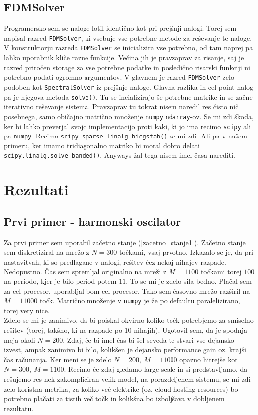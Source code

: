 \documentclass[a4paper]{article}
\begin{document}
\subsection{FDMSolver}
Programersko sem se naloge lotil identično kot pri prejšnji nalogi. Torej sem napisal razred \texttt{FDMSolver},
ki vsebuje vse potrebne metode za reševanje te naloge. V konstruktorju razreda \texttt{FDMSolver} se inicializira
vse potrebno, od tam naprej pa lahko uporabnik kliče razne funkcije. Večina jih je pravzaprav za risanje, saj je 
razred priročen storage za vse potrebne podatke in posledično risarski funkciji ni potrebno podati ogromno argumentov.
V glavnem je razred \texttt{FDMSolver} zelo podoben kot \texttt{SpectralSolver} iz prejšnje naloge. Glavna razlika
in cel point nalog pa je njegova metoda \texttt{solve()}. Tu se incializirajo še potrebne matrike in se začne iterativno
reševanje sistema. Pravzaprav tu tokrat nisem naredil res čisto nič posebnega, samo običajno matrično množenje
\texttt{numpy} \texttt{ndarray}-ov. Se mi zdi škoda, ker bi lahko preverjal svojo implementacijo proti kaki, ki jo 
ima recimo \texttt{scipy} ali pa \texttt{numpy}. Recimo \texttt{scipy.sparse.linalg.bicgstab()} se mi zdi. Ali pa v našem
primeru, ker imamo tridiagonalno matriko bi moral dobro delati \texttt{scipy.linalg.solve\_banded()}. 
Anyways žal tega nisem imel časa narediti.\\

\section{Rezultati}
\subsection{Prvi primer - harmonski oscilator}
Za prvi primer sem uporabil začetno stanje (\ref{zacetno_stanje1}).
Začetno stanje sem diskretiziral na mrežo z $N=300$ točkami, vsaj prvotno. Izkazalo se je,
da pri nastavitvah, ki so predlagane v nalogi, rešitev čez nekaj nihajev razpade. Nedopustno.
Čas sem spremljal originalno na mreži z 
$M=1100$ točkami torej $100$ na periodo, kjer je bilo period potem $11$. To se mi je zdelo sila bedno. 
Plačal sem za cel procesor, uporabljal bom cel procesor. Tako sem časovno mrežo razširil na $M=11000$ točk.
Matrično množenje v \texttt{numpy} je že po defaultu paralelizirano, torej very nice. \\

Zdelo se mi je zanimivo, da bi poiskal okvirno koliko točk potrebjemo za smiselno rešitev (torej, takšno,
ki ne razpade po 10 nihajih). Ugotovil sem, da je spodnja meja okoli $N=200$. Zdaj, če bi imel čas 
bi šel seveda te stvari vse dejansko izvest, ampak zanimivo bi bilo, kolikšen je dejansko performance
gain oz. krajši čas računanja. Ker meni se je zdelo $N = 200,\> M = 11000$ opazno hitrejše kot 
$N = 300,\> M = 1100$. Recimo če zdaj gledamo large scale in si predstavljamo, da rešujemo res nek 
zakompliciran velik model, na porazdeljenem sistemu, se mi zdi zelo koristna metrika, za koliko 
več elektrike (oz. cloud hosting resources) bo potrebno plačati za tistih več točk in
kolikšna bo izboljšava v dobljenem rezultatu. \\
\end{document}
